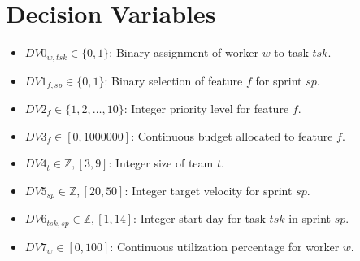 \documentclass[11pt]{article}
\begin{document}
\section{Decision Variables}
\begin{itemize}
    \item $DV0_{w, tsk} \in \{0, 1\}$: Binary assignment of worker $w$ to task $tsk$.
    \item $DV1_{f, sp} \in \{0, 1\}$: Binary selection of feature $f$ for sprint $sp$.
    \item $DV2_{f} \in \{1, 2, \dots, 10\}$: Integer priority level for feature $f$.
    \item $DV3_{f} \in [0, 1000000]$: Continuous budget allocated to feature $f$.
    \item $DV4_{t} \in \mathbb{Z}, [3, 9]$: Integer size of team $t$.
    \item $DV5_{sp} \in \mathbb{Z}, [20, 50]$: Integer target velocity for sprint $sp$.
    \item $DV6_{tsk, sp} \in \mathbb{Z}, [1, 14]$: Integer start day for task $tsk$ in sprint $sp$.
    \item $DV7_{w} \in [0, 100]$: Continuous utilization percentage for worker $w$.
\end{itemize}
\end{document}
